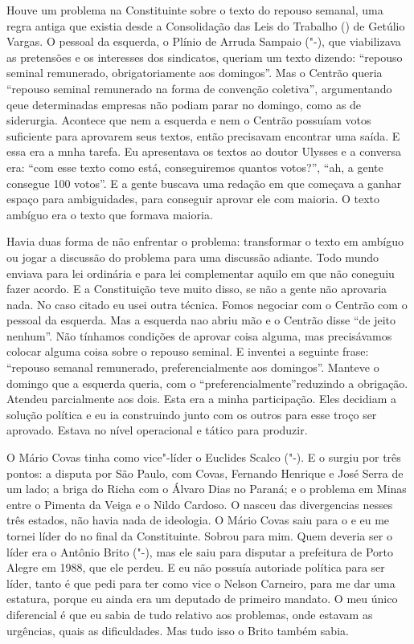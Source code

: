 Houve um problema na Constituinte sobre o texto do repouso semanal, uma
regra antiga que existia desde a Consolidação das Leis do Trabalho ()
de Getúlio Vargas. O pessoal da esquerda, o Plínio de Arruda Sampaio
("-), que viabilizava as pretensões e os interesses dos sindicatos,
queriam um texto dizendo: ``repouso seminal remunerado, obrigatoriamente
aos domingos''. Mas o Centrão queria ``repouso seminal remunerado na
forma de convenção coletiva'', argumentando qeue determinadas empresas
não podiam parar no domingo, como as de siderurgia. Acontece que nem a
esquerda e nem o Centrão possuíam votos suficiente para aprovarem seus
textos, então precisavam encontrar uma saída. E essa era a mnha tarefa.
Eu apresentava os textos ao doutor Ulysses e a conversa era: ``com esse
texto como está, conseguiremos quantos votos?'', ``ah, a gente consegue
100 votos''. E a gente buscava uma redação em que começava a ganhar
espaço para ambiguidades, para conseguir aprovar ele com maioria. O
texto ambíguo era o texto que formava maioria.

Havia duas forma de não enfrentar o problema: transformar o texto em
ambíguo ou jogar a discussão do problema para uma discussão adiante.
Todo mundo enviava para lei ordinária e para lei complementar aquilo em
que não coneguiu fazer acordo. E a Constituição teve muito disso, se não
a gente não aprovaria nada. No caso citado eu usei outra técnica. Fomos
negociar com o Centrão com o pessoal da esquerda. Mas a esquerda nao
abriu mão e o Centrão disse ``de jeito nenhum''. Não tínhamos condições
de aprovar coisa alguma, mas precisávamos colocar alguma coisa sobre o
repouso seminal. E inventei a seguinte frase: ``repouso semanal
remunerado, preferencialmente aos domingos''. Manteve o domingo que a
esquerda queria, com o ``preferencialmente''reduzindo a obrigação.
Atendeu parcialmente aos dois. Esta era a minha participação. Eles
decidiam a solução política e eu ia construindo junto com os outros para
esse troço ser aprovado. Estava no nível operacional e tático para
produzir.

O Mário Covas tinha como vice"-líder o Euclides Scalco ("-). E o
 surgiu por três pontos: a disputa por São Paulo, com Covas,
Fernando Henrique e José Serra de um lado; a briga do Richa com o Álvaro
Dias no Paraná; e o problema em Minas entre o Pimenta da Veiga e o Nildo
Cardoso. O  nasceu das divergencias nesses três estados, não havia
nada de ideologia. O Mário Covas saiu para o  e eu me tornei líder
do  no final da Constituinte. Sobrou para mim. Quem deveria ser o
líder era o Antônio Brito ("-), mas ele saiu para disputar a
prefeitura de Porto Alegre em 1988, que ele perdeu. E eu não possuía
autoriade política para ser líder, tanto é que pedi para ter como vice o
Nelson Carneiro, para me dar uma estatura, porque eu ainda era um
deputado de primeiro mandato. O meu único diferencial é que eu sabia de
tudo relativo aos problemas, onde estavam as urgências, quais as
dificuldades. Mas tudo isso o Brito também sabia.

